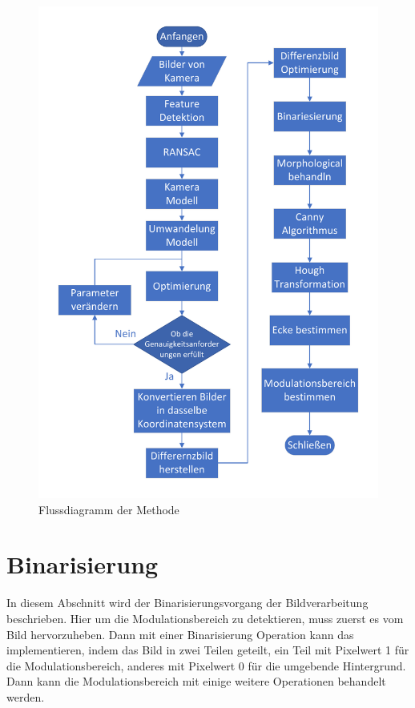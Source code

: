 \begin{figure}[H]
 \centering 
 \includegraphics[keepaspectratio,width=1.0\textwidth]{images/4_ZweiteErfahrung/Flussdiagrammsum.pdf}
 \caption{Flussdiagramm der Methode}
 \label{fig:Flussdiagramm der zweite Methode}
\end{figure}

\section{Binarisierung}

In diesem Abschnitt wird der Binarisierungsvorgang der Bildverarbeitung beschrieben. Hier um die Modulationsbereich zu detektieren, muss zuerst es vom Bild hervorzuheben. Dann mit einer Binarisierung Operation kann das implementieren, indem das Bild in zwei Teilen geteilt, ein Teil mit Pixelwert 1 für die Modulationsbereich, anderes mit Pixelwert 0 für die umgebende Hintergrund. Dann kann die Modulationsbereich mit einige weitere Operationen behandelt werden.

